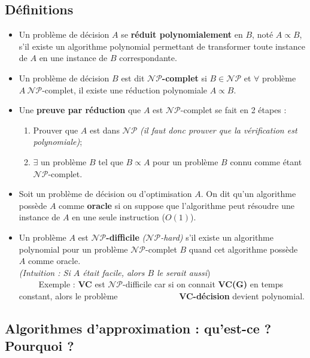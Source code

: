 \documentclass{article}
\newcommand{\quotecolor}[1]{\textcolor{quote}{#1}}
\begin{document}
\begin{sffamily}
\subsection*{Définitions}
\begin{itemize}
\item Un problème de décision $A$ se \textbf{réduit polynomialement} en $B$,
noté $A\propto B$, s'il existe un algorithme polynomial permettant de
transformer toute instance de $A$ en une instance de $B$ correspondante.
\item Un problème de décision $B$ est dit \textbf{$\mathcal{NP}$-complet} si
$B \in \mathcal{NP}$ et $\forall$ problème $A\ \mathcal{NP}$-complet, il existe
une réduction polynomiale $A\propto B$.
\item Une \textbf{preuve par réduction} que $A$ est $\mathcal{NP}$-complet se
fait en 2 étapes :
\begin{enumerate}
\item Prouver que $A$ est dans $\mathcal{NP}$ \textit{(il faut donc prouver que
la vérification est polynomiale)};
\item $\exists$ un problème $B$ tel que $B\propto A$ pour un problème $B$ connu
comme étant $\mathcal{NP}$-complet.
\end{enumerate}
\item Soit un problème de décision ou d'optimisation $A$. On dit qu'un
algorithme possède $A$ comme \textbf{oracle} si on suppose que l'algorithme peut
résoudre une instance de $A$ en une seule instruction ($O(1)$).
\item Un problème $A$ est \textbf{$\mathcal{NP}$-difficile}
\textit{($\mathcal{NP}$-hard)} s'il existe un algorithme polynomial pour un
problème $\mathcal{NP}$-complet $B$ quand cet algorithme possède $A$ comme
oracle. \\
\textit{(Intuition : Si $A$ était facile, alors $B$ le serait aussi})\\
\indent$\qquad$ Exemple : \textbf{VC} est $\mathcal{NP}$-difficile car si on
connait \textbf{VC(G)} en temps constant, alors le problème
\indent$\qquad\qquad\qquad\quad$\textbf{VC-décision} devient polynomial.
\end{itemize}

\subsection{Algorithmes d'approximation : qu'est-ce ? Pourquoi ?}


\end{sffamily}
\end{document}

